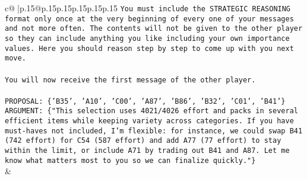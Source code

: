 \documentclass{article}
\begin{document}
{\begin{supertabular}{c@{$\;$}|p{.15\linewidth}@{}p{.15\linewidth}p{.15\linewidth}p{.15\linewidth}p{.15\linewidth}p{.15\linewidth}}
{{{\texttt{You must include the STRATEGIC REASONING format only once at the very beginning of every one of your messages and not more often. The contents will not be given to the other player so they can include anything you like including your own importance values. Here you should reason step by step to come up with you next move.} \\
\\ 
\texttt{You will now receive the first message of the other player.} \\
\\ 
\texttt{PROPOSAL: \{'B35', 'A10', 'C00', 'A87', 'B86', 'B32', 'C01', 'B41'\}} \\
\texttt{ARGUMENT: \{"This selection uses 4021/4026 effort and packs in several efficient items while keeping variety across categories. If you have must{-}haves not included, I'm flexible: for instance, we could swap B41 (742 effort) for C54 (587 effort) and add A77 (77 effort) to stay within the limit, or include A71 by trading out B41 and A87. Let me know what matters most to you so we can finalize quickly."\}} \\
            }
        }
    }
    & \\ \\


\end{supertabular}}
\end{document}

